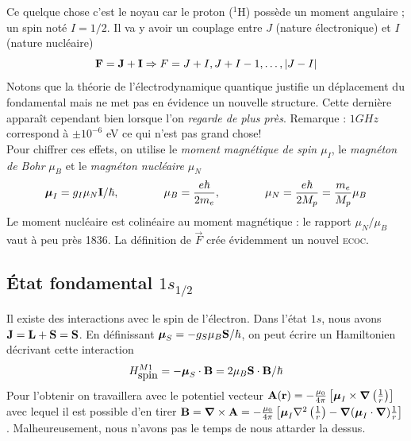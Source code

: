 Ce quelque chose c'est le noyau car le proton ($^1$H) possède un moment angulaire ; un spin noté
$I=1/2$. Il va y avoir un couplage entre $J$ (nature électronique) et $I$ (nature nucléaire)
\begin{equation}
{\bf F} = {\bf J} + {\bf I} \Rightarrow 
F = J+I, J+I-1, \ldots, \vert J-I \vert
\end{equation}
Notons que la théorie de l'électrodynamique quantique justifie un déplacement du fondamental mais
ne met pas en évidence un nouvelle structure. Cette dernière apparaît cependant bien lorsque
l'on \textit{regarde de plus près}. Remarque : $1GHz$ correspond à $\pm 10^{-6}$ eV ce qui n'est 
pas grand chose!\\

Pour chiffrer ces effets, on utilise le \textit{moment magnétique de spin $\mu_I$}, le 
\textit{magnéton de Bohr} $\mu_B$ et le \textit{magnéton nucléaire} $\mu_N$
\begin{equation}
\mbox{\boldmath $ \mu $}_I = g_I \mu_N {\bf I}/ \hbar,\qquad\qquad
\mu_B = \frac{e \hbar}{2m_e},\qquad\qquad
\mu_N = \frac{e \hbar}{2M_p} = \frac{m_e}{M_p} \mu_B
\end{equation}
Le moment nucléaire est colinéaire au moment magnétique : le rapport $\mu_N/\mu_B$ vaut à peu près
1836. La définition de $\vec F$ crée évidemment un nouvel \textsc{ecoc}.

\subsection{État fondamental $1s_{1/2}$}
Il existe des interactions avec le spin de l'électron. Dans l'état $1s$, nous avons 
${\bf J} = {\bf L} + {\bf S} = {\bf S}$. En définissant $\mbox{\boldmath $ \mu $}_S = -g_S \mu_B {\bf
S}/ \hbar$, on peut écrire un Hamiltonien décrivant cette interaction
\begin{equation}
H^{M1}_{\mbox{spin}} = - \mbox{\boldmath $ \mu $}_S \cdot 
{\bf B} = 2 \mu_B {\bf S} \cdot {\bf B} / \hbar
\end{equation}
Pour l'obtenir on travaillera avec le potentiel vecteur ${\bf A} ({\bf r}) = - \frac{\mu_0}{4 \pi}
\left[ \mbox{\boldmath $ \mu $}_I \times \mbox{\boldmath $ \nabla $} \left( \frac{1}{r} \right)
\right]$ avec lequel il est possible d'en tirer ${\bf B} = \mbox{\boldmath $ \nabla $} \times {\bf A}
= -\frac{\mu_0}{4 \pi} \left[\mbox{\boldmath $ \mu $}_I \nabla^2 \left( \frac{1}{r}  \right)
 - \mbox{\boldmath $ \nabla $} ( \mbox{\boldmath $ \mu $}_I \cdot \mbox{\boldmath $ \nabla $} )
\frac{1}{r} \right]$. Malheureusement, nous n'avons pas le temps de nous attarder la dessus.\\


